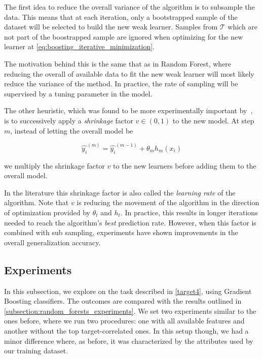 The first idea to reduce the overall variance of the algorithm is to subsample the data.
This means that at each iteration, only a bootstrapped sample of the dataset will be selected to build the new weak learner.
Samples from $\mathcal{T}$ which are not part of the boostrapped sample are ignored when optimizing for the new learner at \cref{eq:boosting_iterative_minimization}.

The motivation behind this is the same that as in Random Forest, where reducing the overall of available data to fit the new weak learner will most likely reduce the variance of the method.
In practice, the rate of sampling will be supervised by a tuning parameter in the model.

The other heuristic, which was found to be more experimentally important by~\cite{hastie-elemstatslearn}, is to successively apply a \textit{shrinkage} factor $v \in (0,1)$ to the new model.
At step $m$, instead of letting the overall model be

\begin{equation}
\hat{y_i}^{(m)} = \hat{y_i}^{(m-1)} + \theta_m h_m(x_i)
\end{equation}

 we multiply the shrinkage factor $v$ to the new learners before adding them to the overall model.

In the literature this shrinkage factor is also called the \textit{learning rate} of the algorithm.
Note that $v$ is reducing the movement of the algorithm in the direction of optimization provided by $\theta_t$ and $h_t$.
In practice, this results in longer iterations needed to reach the algorithm's \textit{best} prediction rate.
However, when this factor is combined with sub sampling, experiments have shown improvements in the overall generalization accuracy.


\subsection{Experiments}\label{subsection:boosting_experiments}


In this subsection, we explore on the task described in \cref{target4}, using Gradient Boosting classifiers.
The outcomes are compared with the results outlined in \cref{subsection:random_forests_experiments}.
We set two experiments similar to the ones before, where we run two procedures: one with all available features and another without the top target-correlated ones.
In this setup though, we had a minor difference where, as before, it was characterized by the attributes used by our training dataset.

